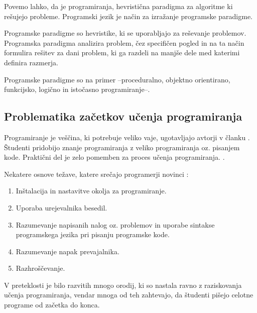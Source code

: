 Povemo lahko, da je programiranja, hevristična paradigma za algoritme
ki rešujejo probleme. Programski jezik je način za izražanje
programske paradigme.

Programske paradigme so hevristike, ki se uporabljajo za reševanje
problemov. Programska paradigma analizira problem, čez specifičen
pogled in na ta način formulira rešitev za dani problem, ki ga razdeli
na manjše dele med katerimi definira razmerja.

Programske paradigme so na primer --proceduralno, objektno orientirano,
funkcijsko, logično in istočasno programiranje--.

\subsection{Problematika začetkov učenja programiranja}
\label{sec:Problematika_začetkov_učenja_programiranja}



Programiranje je veščina, ki potrebuje veliko vaje, ugotavljajo
avtorji v članku \cite{ITaLCP_DistanceEdu}. Študenti pridobijo znanje
programiranja z veliko programiranja oz. pisanjem kode. Praktični del je
zelo pomemben za proces učenja programiranja.
\cite{ITaLCP_DistanceEdu}.

Nekatere osnove težave, katere srečajo programerji novinci \cite{thesisAWebP}:
\begin{enumerate}
\item
  Inštalacija in nastavitve okolja za programiranje.
\item
  Uporaba urejevalnika besedil.
\item Razumevanje napisanih nalog oz. problemov in uporabe sintakse
  programskega jezika pri pisanju programske kode.
\item
  Razumevanje napak prevajalnika.
\item
  Razhroščevanje.
\end{enumerate}

V preteklosti je bilo razvitih mnogo orodij, ki so nastala ravno z
raziskovanja učenja programiranja, vendar mnoga od teh zahtevajo, da
študenti pišejo celotne programe od začetka do konca.

